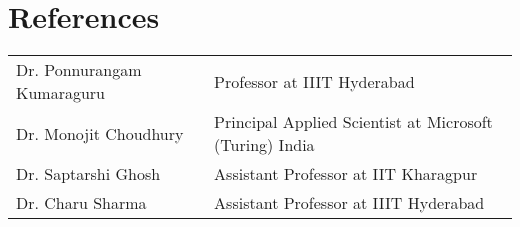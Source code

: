 \documentclass[10pt, a4paper]{article}
\newcommand{\TablePad}{\vspace{-0.4cm}}
\begin{document}
\section{References}
\begin{tabularx}{\textwidth}{@{}p{}p{}@{}}
  Dr. Ponnurangam Kumaraguru & Professor at IIIT Hyderabad
  \\
  Dr. Monojit Choudhury & Principal Applied Scientist at Microsoft (Turing) India
  \\
  Dr. Saptarshi Ghosh & Assistant Professor at IIT Kharagpur
  \\
  Dr. Charu Sharma & Assistant Professor at IIIT Hyderabad 
\end{tabularx}


\end{document}
